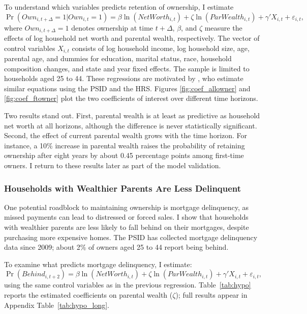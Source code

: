 \documentclass[12pt]{article}
\begin{document}
To understand which variables predicts retention of ownership, I estimate
\begin{equation}	\label{eq:regmaintain}
	\Pr\left(Own_{i,t+\Delta}=1|Own_{i,t}=1\right)
	= \beta\ln(NetWorth_{i,t}) + \zeta\ln(ParWealth_{i,t})
	  + \gamma' X_{i,t} + \varepsilon_{i,t},
\end{equation}
where $Own_{i,t+\Delta}=1$ denotes ownership at time $t+\Delta$, $\beta$, and $\zeta$ measure the effects of log household net worth and parental wealth, respectively. The vector of control variables  $X_{i,t}$ consists of log household income, log household size, age, parental age, and dummies for  education, marital status, race, household composition changes, and state and year fixed effects.  The sample is limited to households aged 25 to 44. These regressions are motivated by \cite{bond2021role}, who estimate similar equations using the PSID and the HRS. Figures \ref{fig:coef_allowner} and \ref{fig:coef_ftowner} plot the two coefficients of interest over different time horizons.

Two results stand out. First, parental wealth is at least as predictive as household net worth at all horizons, although the difference is never statistically significant. Second, the effect of current parental wealth grows with the time horizon. For instance, a 10\% increase in parental wealth raises the probability of retaining ownership after eight years by about 0.45 percentage points among first-time owners. I return to these results later as part of the model validation.


\subsubsection{Households with Wealthier Parents Are Less Delinquent} 
One potential roadblock to maintaining ownership is mortgage delinquency, as missed payments can lead to distressed or forced sales. I show that households with wealthier parents are less likely to fall behind on their mortgages, despite purchasing more expensive homes. The PSID has collected mortgage delinquency data since 2009; about 2\% of owners aged 25 to 44 report being behind.

To examine what predicts mortgage delinquency, I estimate: 
\begin{equation}\label{eq:regbehind}
\Pr(Behind_{i,t+2}) = \beta\ln(NetWorth_{i,t}) + \zeta\ln(ParWealth_{i,t}) + \gamma' X_{i,t} + \varepsilon_{i,t},
\end{equation}
using the same control variables as in the previous regression. Table~\ref{tab:hypo} reports the estimated coefficients on parental wealth ($\zeta$); full results appear in Appendix Table~\ref{tab:hypo_long}.  
\end{document}
